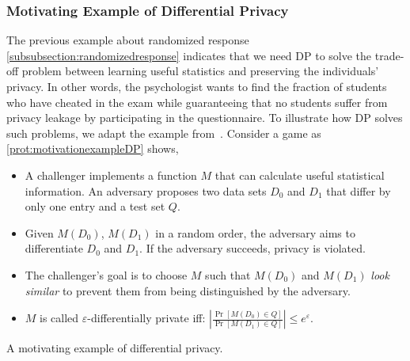 \subsubsection{Motivating Example of Differential Privacy}
\label{subsubsec:motivatingexampleDP}
The previous example about randomized response \autoref{subsubsection:randomizedresponse} indicates that we need DP to solve the trade-off problem between learning useful statistics and preserving the individuals' privacy. In other words, the psychologist wants to find the fraction of students who have cheated in the exam while guaranteeing that no students suffer from privacy leakage by participating in the questionnaire.
To illustrate how DP solves such problems, we adapt the example from~\cite{simpleexplanDP}.
Consider a game as \autoref{prot:motivationexampleDP} shows,
\begin{itemize}
    \item A challenger implements a function $M$ that can calculate useful statistical information. An adversary proposes two data sets $D_{0}$ and $D_{1}$ that differ by only one entry and a test set $Q$.
    \item Given $M\left( D_{0}\right) $, $M\left( D_{1}\right) $ in a random order, the adversary aims to differentiate $D_{0}$ and $D_{1}$. If the adversary succeeds, privacy is violated.
    \item The challenger's goal is to choose $M$ such that $M\left( D_{0}\right) $ and $M\left( D_{1}\right) $ \textit{look} \textit{similar} to prevent them from being distinguished by the adversary.
    \item $M$ is called $\varepsilon$-differentially private iff: $\left| \frac{\Pr \left[ M\left( D_{0}\right) \in Q\right] }{\Pr \left[ M\left( D_{1}\right) \in Q \right] }\right|\leq e^{\varepsilon}$.
\end{itemize}

\begin{protocol}[tbh!]
    \centering
    \caption{A motivating example of differential privacy.}
    \label{prot:motivationexampleDP}
\end{protocol}
\FloatBarrier


